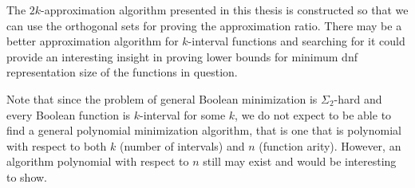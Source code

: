 The $2k$-approximation algorithm presented in this thesis
is constructed so that we can use the orthogonal sets
for proving the approximation ratio.
There may be a better approximation algorithm
for $k$-interval functions
and searching for it could provide an interesting insight
in proving lower bounds for minimum \acrshort{dnf}
representation size of the functions in question.


Note that since the problem
of general Boolean minimization
is $\Sigma_2$-hard \citep{Umans1998}
and every Boolean function is $k$-interval for some $k$,
we do not expect to be able to find
a general polynomial minimization algorithm,
that is one that is polynomial
with respect to both $k$ (number of intervals) and $n$ (function arity).
However,
an algorithm polynomial with respect to $n$ still may exist and would be interesting to show.
